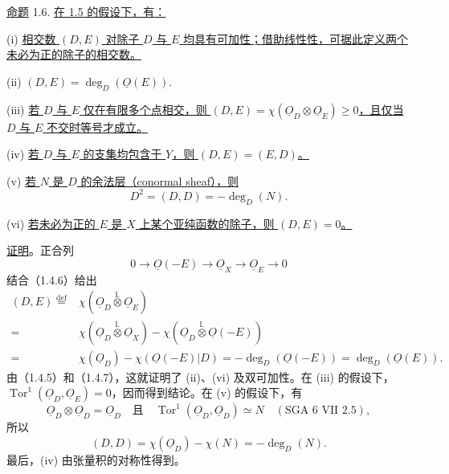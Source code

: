 \underline{命题} 1.6. \underline{在 1.5 的假设下，有：}

(i) \quad \underline{相交数 $(D,E)$ 对除子 $D$ 与 $E$ 均具有可加性；借助线性性，可据此定义两个未必为正的除子的相交数。}


(ii) \quad $(D,E)=\deg_D(\underline O(E))$.

(iii) \quad \underline{若 $D$ 与 $E$ 仅在有限多个点相交，则 $(D,E)=\chi(\underline{O}_D\otimes\underline{O}_E)\geq0$，且仅当 $D$ 与 $E$ 不交时等号才成立。}

(iv) \quad \underline{若 $D$ 与 $E$ 的支集均包含于 $Y$，则 $(D,E)=(E,D)$。}

(v) \quad \underline{若 $N$ 是 $D$ 的余法层（conormal sheaf），则}
\begin{equation*}
D^2=(D,D)=-\deg_D(N).
\end{equation*}

(vi) \quad \underline{若未必为正的 $E$ 是 $X$ 上某个亚纯函数的除子，则 $(D,E)=0$。}

\underline{证明}。正合列
\begin{equation*}
0\longrightarrow\underline O(-E)\longrightarrow\underline O_X
\longrightarrow\underline O_E\longrightarrow0
\end{equation*}
结合（1.4.6）给出
\begin{equation*}
\begin{array}{rl}
(D,E)\overset{\mathrm{def}}{=}&
\chi(\underline{O}_D\overset{\mathbb L}{\otimes}\underline{O}_E)\\
=&\chi(\underline{O}_D\overset{\mathbb L}{\otimes}\underline{O}_X)
-\chi(\underline{O}_D\overset{\mathbb L}{\otimes}\underline O(-E))\\[1ex]
=&\chi(\underline{O}_D)-\chi(\underline O(-E)|D)
=-\deg_D(\underline O(-E))=\deg_D(\underline O(E)).
\end{array}
\end{equation*}
由（1.4.5）和（1.4.7），这就证明了 (ii)、(vi) 及双可加性。在 (iii) 的假设下，$\operatorname{Tor}^1(\underline{O}_D,\underline{O}_E)=0$，因而得到结论。在 (v) 的假设下，有
\begin{equation*}
\underline{O}_D\otimes\underline{O}_D=\underline{O}_D
\quad\text{且}\quad
\operatorname{Tor}^1(\underline{O}_D,\underline{O}_D)\simeq N
\quad(\text{SGA 6 VII 2.5}),
\end{equation*}
所以
\begin{equation*}
(D,D)=\chi(\underline{O}_D)-\chi(N)=-\deg_D(N).
\end{equation*}
最后，(iv) 由张量积的对称性得到。


